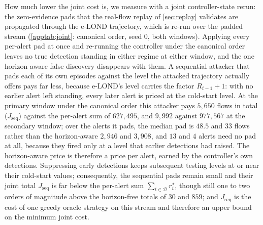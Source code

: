 \documentclass[conference]{IEEEtran}
\begin{document}
How much lower the joint cost is, we measure with a joint controller-state rerun: the zero-evidence
pads that the real-flow replay of \cref{sec:replay} validates are propagated through the e-LOND
trajectory, which is re-run over the padded stream (\cref{apptab:joint}: canonical order, seed 0, both
windows). Applying every per-alert pad at once and re-running the controller under the canonical order leaves no true detection standing in
either regime at either window, and the one horizon-aware false discovery disappears with them. A
sequential attacker that pads each of its own episodes against the level the attacked trajectory
actually offers pays far less, because e-LOND's level carries the factor $R_{t-1}+1$: with no earlier
alert left standing, every later alert is priced at the cold-start level. At the primary window under
the canonical order this attacker pays $5{,}650$ flows in total ($J_{\mathrm{seq}}$) against the per-alert sum of
$627{,}495$, and $9{,}992$ against $977{,}567$ at the secondary window; over the alerts it pads, the
median pad is $48.5$ and $33$ flows rather than the horizon-aware $2{,}946$ and $3{,}908$, and $13$ and
$4$ alerts need no pad at all, because they fired only at a level that earlier detections had raised.
The horizon-aware price is therefore a price per alert, earned by the controller's own detections.
Suppressing early detections keeps subsequent testing levels at or near their cold-start values;
consequently, the sequential pads remain small and their joint total $J_{\mathrm{seq}}$ is far below
the per-alert sum $\sum_{t\in\mathcal D} r^{\star}_t$, though still one to two orders of magnitude above the
horizon-free totals of $30$ and $859$; and $J_{\mathrm{seq}}$ is the cost of one greedy oracle strategy
on this stream and therefore an upper bound on the minimum joint cost.
\end{document}
